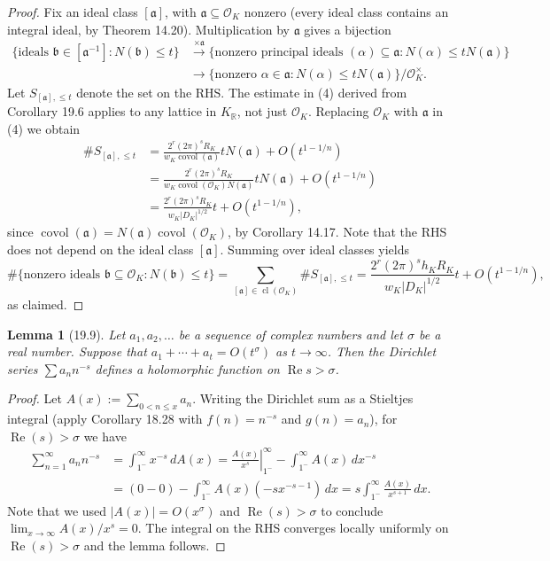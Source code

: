 \documentclass[UTF8,11pt]{ctexart}
\newtheorem*{lemma}{Lemma}
\theoremstyle{definition}
\newcommand{\R}{\mathbb R}
\begin{document}
\begin{proof}
Fix an ideal class $[\mathfrak a]$, with $\mathfrak a\subseteq\mathcal O_K$ nonzero (every ideal class contains an integral ideal, by Theorem 14.20). Multiplication by $\mathfrak a$ gives a bijection
\begin{align*}
\{\text{ideals }\mathfrak b\in[\mathfrak a^{-1}]:N(\mathfrak b)\leq t\}
&\xrightarrow{\times\mathfrak a}\{\text{nonzero principal ideals }(\alpha)\subseteq\mathfrak a:N(\alpha)\leq tN(\mathfrak a)\}\\
&\longrightarrow\{\text{nonzero }\alpha\in\mathfrak a:N(\alpha)\leq tN(\mathfrak a)\}/\mathcal O_K^\times.
\end{align*}
Let $S_{[\mathfrak a],\leq t}$ denote the set on the RHS. The estimate in (4) derived from Corollary 19.6 applies to any lattice in $K_\R$, not just $\mathcal O_K$. Replacing $\mathcal O_K$ with $\mathfrak a$ in (4) we obtain
\begin{align*}
\#S_{[\mathfrak a],\leq t}
&=\frac{2^r(2\pi)^sR_K}{w_K\operatorname{covol}(\mathfrak a)}tN(\mathfrak a)+O(t^{1-1/n})\\
&=\frac{2^r(2\pi)^sR_K}{w_K\operatorname{covol}(\mathcal O_K)N(\mathfrak a)}tN(\mathfrak a)+O(t^{1-1/n})\\
&=\frac{2^r(2\pi)^sR_K}{w_K|D_K|^{1/2}}t+O(t^{1-1/n}),
\end{align*}
since $\operatorname{covol}(\mathfrak a)=N(\mathfrak a)\operatorname{covol}(\mathcal O_K)$, by Corollary 14.17. Note that the RHS does not depend on the ideal class $[\mathfrak a]$. Summing over ideal classes yields
\[
\#\{\text{nonzero ideals }\mathfrak b\subseteq\mathcal O_K:N(\mathfrak b)\leq t\}
=\sum_{[\mathfrak a]\in\operatorname{cl}(\mathcal O_K)}\#S_{[\mathfrak a],\leq t}
=\frac{2^r(2\pi)^sh_KR_K}{w_K|D_K|^{1/2}}t+O(t^{1-1/n}),
\]
as claimed.
\end{proof}
\begin{lemma}[19.9]
Let $a_1,a_2,\ldots$ be a sequence of complex numbers and let $\sigma$ be a real number. Suppose that $a_1+\cdots+a_t=O(t^\sigma)$ as $t\to\infty$. Then the Dirichlet series $\sum a_nn^{-s}$ defines a holomorphic function on $\operatorname{Re}s>\sigma$.
\end{lemma}
\begin{proof}
Let $A(x):=\sum_{0<n\leq x}a_n$. Writing the Dirichlet sum as a Stieltjes integral (apply Corollary 18.28 with $f(n)=n^{-s}$ and $g(n)=a_n$), for $\operatorname{Re}(s)>\sigma$ we have
\begin{align*}
\sum_{n=1}^\infty a_nn^{-s}
&=\int_{1^-}^\infty x^{-s}\,dA(x)
=\left.\frac{A(x)}{x^s}\right|_{1^-}^\infty-\int_{1^-}^\infty A(x)\,dx^{-s}\\
&=(0-0)-\int_{1^-}^\infty A(x)(-sx^{-s-1})\,dx
=s\int_{1^-}^\infty\frac{A(x)}{x^{s+1}}\,dx.
\end{align*}
Note that we used $|A(x)|=O(x^\sigma)$ and $\operatorname{Re}(s)>\sigma$ to conclude $\lim_{x\to\infty}A(x)/x^s=0$. The integral on the RHS converges locally uniformly on $\operatorname{Re}(s)>\sigma$ and the lemma follows.
\end{proof}
\end{document}
